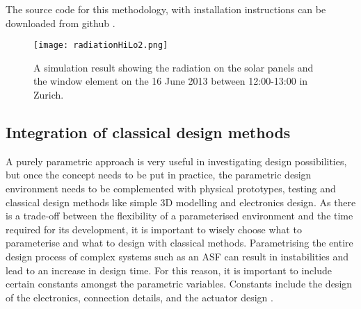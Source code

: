 The source code for this methodology, with installation instructions can be downloaded from github \cite{ASFGitHub,RCGitHub}.


\begin{figure}
\begin{center}
\texttt{[image: radiationHiLo2.png]}
\caption{A simulation result showing the radiation on the solar panels and the window element on the 16 June 2013 between 12:00-13:00 in Zurich.}
\label{fig:radiation}
\end{center}
\end{figure}


\subsection{Integration of classical design methods}

A purely parametric approach is very useful in investigating design possibilities, but once the concept needs to be put in practice, the parametric design environment needs to be complemented with physical prototypes, testing and classical design methods like simple 3D modelling and electronics design.
As there is a trade-off  between the  flexibility of a parameterised environment and the time required for its development, it is important to wisely choose what to parameterise and what to design with classical methods. Parametrising the entire design process of complex systems such as an ASF can result in instabilities and lead to an increase in design time. For this reason, it is important to include certain constants amongst the parametric variables. Constants include the design of the electronics, connection details, and the actuator design \cite{Svetozarevic2017a,svetozarevic2016soro}.


